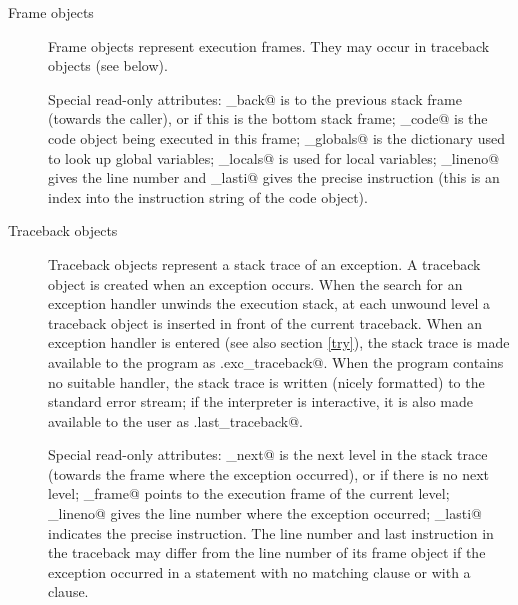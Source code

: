 \begin{description}
\begin{description}
\item[Frame objects]
Frame objects represent execution frames.  They may occur in traceback
objects (see below).

Special read-only attributes: \verb@f_back@ is to the previous
stack frame (towards the caller), or \verb@None@ if this is the bottom
stack frame; \verb@f_code@ is the code object being executed in this
frame; \verb@f_globals@ is the dictionary used to look up global
variables; \verb@f_locals@ is used for local variables;
\verb@f_lineno@ gives the line number and \verb@f_lasti@ gives the
precise instruction (this is an index into the instruction string of
the code object).

\item[Traceback objects] \label{traceback}
Traceback objects represent a stack trace of an exception.  A
traceback object is created when an exception occurs.  When the search
for an exception handler unwinds the execution stack, at each unwound
level a traceback object is inserted in front of the current
traceback.  When an exception handler is entered
(see also section \ref{try}), the stack trace is
made available to the program as \verb@sys.exc_traceback@.  When the
program contains no suitable handler, the stack trace is written
(nicely formatted) to the standard error stream; if the interpreter is
interactive, it is also made available to the user as
\verb@sys.last_traceback@.

Special read-only attributes: \verb@tb_next@ is the next level in the
stack trace (towards the frame where the exception occurred), or
\verb@None@ if there is no next level; \verb@tb_frame@ points to the
execution frame of the current level; \verb@tb_lineno@ gives the line
number where the exception occurred; \verb@tb_lasti@ indicates the
precise instruction.  The line number and last instruction in the
traceback may differ from the line number of its frame object if the
exception occurred in a \verb@try@ statement with no matching
\verb@except@ clause or with a \verb@finally@ clause.

\end{description} %

\end{description} %


